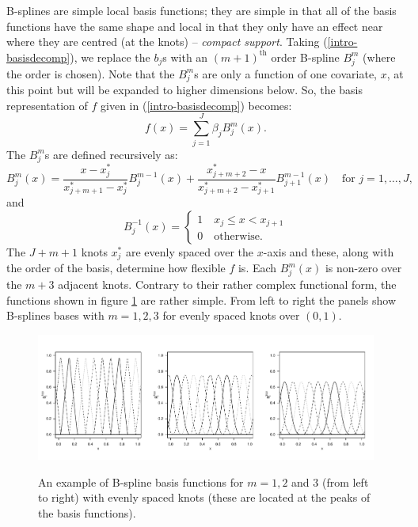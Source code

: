 B-splines are simple local basis functions; they are simple in that all of the basis functions have the same shape and local in that they only have an effect near where they are centred (at the knots) -- \textit{compact support}. Taking (\ref{intro-basisdecomp}), we replace the $b_j$s with an $(m+1)^\text{th}$ order B-spline $B_j^m$ (where the order is chosen). Note that the $B_j^m$s are only a function of one covariate, $x$, at this point but will be expanded to higher dimensions below. So, the basis representation of $f$ given in (\ref{intro-basisdecomp}) becomes:
\begin{equation*}
f(x) = \sum_{j=1}^{J} \beta_j B^m_j(x).
\end{equation*}
The $B_j^m$s are defined recursively as:
\begin{equation*}
B_j^m(x) = \frac{x-x^*_j}{x^*_{j+m+1} - x^*_j} B_j^{m-1}(x) + \frac{x^*_{j+m+2} -x}{x^*_{j+m+2} - x^*_{j+1}} B_{j+1}^{m-1}(x) \quad \text{for } j=1,\ldots,J,
\end{equation*}
and
\begin{equation*}
 B_j^{-1}(x)=\begin{cases}
1 \quad x_j \leq x < x_{j+1}\\
0 \quad \text{otherwise}. 
\end{cases}
\end{equation*}
The $J+m+1$ knots $x^*_j$ are evenly spaced over the $x$-axis and these, along with the order of the basis, determine how flexible $f$ is. Each $B^m_j(x)$ is non-zero over the $m+3$ adjacent knots. Contrary to their rather complex functional form, the functions shown in figure \ref{bs-basis} are rather simple. From left to right the panels show B-splines bases with $m=1,2,3$ for evenly spaced knots over $(0,1)$.

\begin{figure}[tb]
\centering
\includegraphics[width=\textwidth]{intro/figs/bspline-ex.pdf}\\
\caption{An example of B-spline basis functions for $m=1, 2$ and $3$ (from left to right) with evenly spaced knots (these are located at the peaks of the basis functions).}
\label{bs-basis}
\end{figure}

